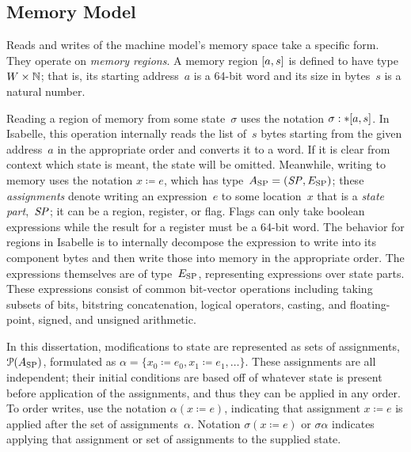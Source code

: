 \subsection{Memory Model}
Reads and writes of the machine model's memory space take a specific form.
They operate on \emph{memory regions}.%
A memory region $[a,s]$ is defined to have type $W\times\mathbb{N}$;%
%
that is, its starting address~$a$ is a 64-bit word
and its size in bytes~$s$ is a natural number.

Reading a region of memory from some state~$\sigma$
uses the notation $\sigma:\ast[a,s]$.
In Isabelle, this operation internally reads the list of~$s$ bytes
starting from the given address~$a$ in the appropriate order
and converts it to a word.
If it is clear from context which state is meant, the state will be omitted.
Meanwhile, writing to memory uses the notation $x\coloneqq e$,
which has type~$A_\mathrm{SP}=(\mathit{SP},E_\mathrm{SP})$;
these \emph{assignments} denote writing an expression~$e$ to some location~$x$
that is a \emph{state part},~$\mathit{SP}$;%
%
it can be a region, register, or flag.
Flags can only take boolean expressions while
the result for a register must be a 64-bit word.
The behavior for regions in Isabelle
is to internally decompose the expression to write
into its component bytes and then write those into memory in the appropriate order.
The expressions themselves are of type~$E_\mathrm{SP}$,%
representing expressions over state parts.
These expressions consist of common bit-vector operations including
taking subsets of bits, bitstring concatenation, logical operators, casting,
and floating-point, signed, and unsigned arithmetic.

In this dissertation,
modifications to state are represented as sets of assignments,~$\operatorname{\mathcal{P}}(A_\mathrm{SP})$,
formulated as $\alpha=\{x_0\coloneqq e_0,x_1\coloneqq e_1,\dotsc\}$.
These assignments are all independent; their initial conditions
are based off of whatever state is present before application of the assignments,
and thus they can be applied in any order.
To order writes, use the notation $\alpha(x\coloneqq e)$,
indicating that assignment $x\coloneqq e$ is applied
after the set of assignments~$\alpha$.
Notation $\sigma(x\coloneqq e)$ or $\sigma\alpha$ indicates applying that assignment
or set of assignments to the supplied state.

